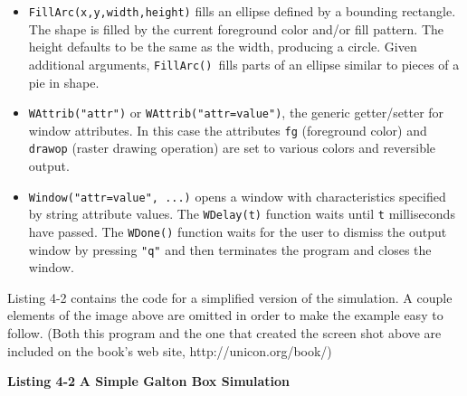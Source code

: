 \begin{itemize}\itemsep0pt
\item \texttt{FillArc(x,y,width,height)} fills an ellipse defined by a
bounding rectangle. The shape is filled by the current foreground color
and/or fill pattern. The height defaults to be the same as the width,
producing a circle. Given additional arguments, \texttt{FillArc()
}fills parts of an ellipse similar to pieces of a pie in shape.
\item \texttt{WAttrib("attr")} or
\texttt{WAttrib("attr=value")}, the generic
getter/setter for window attributes.
In this case the attributes \texttt{fg} (foreground color) and
\texttt{drawop} (raster drawing operation) are set to various colors
and reversible output.
\item \texttt{Window("attr=value", ...)}
opens a window with characteristics specified by string
attribute values. The \texttt{WDelay(t)} function waits until
\texttt{t} milliseconds have passed. The \texttt{WDone()} function
waits for the user to dismiss the output window by pressing
\texttt{"q"} and then terminates the
program and closes the window.
\end{itemize}
Listing 4-2 contains the code for a simplified version of the
simulation. A couple elements of the image above are omitted in order
to make the example easy to follow. (Both this program and the one that
created the screen shot above are included on the
book's web site, http://unicon.org/book/)

{\sffamily\bfseries Listing 4-2}
{\sffamily\bfseries A Simple Galton Box Simulation}


